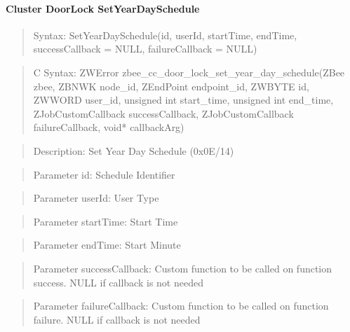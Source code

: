 \paragraph{Cluster DoorLock SetYearDaySchedule}
\begin{quote}Syntax: SetYearDaySchedule(id, userId, startTime, endTime, successCallback = NULL, failureCallback = NULL)\end{quote}
\begin{quote}C Syntax: ZWError zbee\_cc\_door\_lock\_set\_year\_day\_schedule(ZBee zbee, ZBNWK node\_id, ZEndPoint endpoint\_id, ZWBYTE id, ZWWORD user\_id, unsigned int start\_time, unsigned int end\_time, ZJobCustomCallback successCallback, ZJobCustomCallback failureCallback, void* callbackArg)\end{quote}
\begin{quote}Description: Set Year Day Schedule (0x0E/14)\end{quote}
\begin{quote}Parameter id: Schedule Identifier\end{quote}
\begin{quote}Parameter userId: User Type\end{quote}
\begin{quote}Parameter startTime: Start Time\end{quote}
\begin{quote}Parameter endTime: Start Minute\end{quote}
\begin{quote}Parameter successCallback: Custom function to be called on function success. NULL if callback is not needed\end{quote}
\begin{quote}Parameter failureCallback: Custom function to be called on function failure. NULL if callback is not needed\end{quote}


